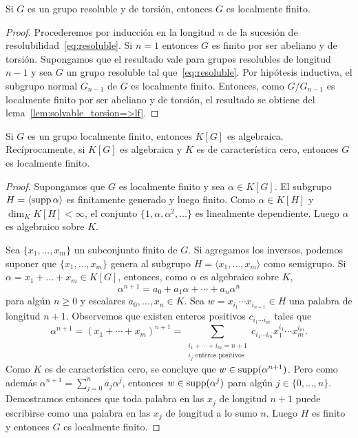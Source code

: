 \begin{exercise}
\begin{proposition}
	Si $G$ es un grupo resoluble y de torsión, entonces $G$ es localmente
	finito.
\end{proposition}

\begin{proof}
	Procederemos por inducción en la longitud $n$ de la sucesión de
	resolubilidad~\eqref{eq:resoluble}. Si $n=1$ entonces $G$ es finito por ser
	abeliano y de torsión. Supongamos que el resultado vale para grupos
	resolubles de longitud $n-1$ y sea $G$ un grupo resoluble tal
	que~\eqref{eq:resoluble}. Por hipótesis inductiva, el subgrupo normal
	$G_{n-1}$ de $G$ es localmente finito. Entonces, como $G/G_{n-1}$ es
	localmente finito por ser abeliano y de torsión, el resultado se obtiene
	del lema~\ref{lem:solvable_torsion=>lf}.
\end{proof}

\begin{theorem}[Herstein]
	Si $G$ es un grupo localmente finito, entonces $K[G]$ es algebraica.
	Recíprocamente, si $K[G]$ es algebraica y $K$ es de característica cero,
	entonces $G$ es localmente finito.
\end{theorem}

\begin{proof}
	Supongamos que $G$ es localmente finito y sea $\alpha\in K[G]$. El subgrupo
	$H=\langle\operatorname{supp}\alpha\rangle$ es finitamente generado y luego finito. Como
	$\alpha\in K[H]$ y $\dim_KK[H]<\infty$, el conjunto
	$\{1,\alpha,\alpha^2,\dots\}$ es linealmente dependiente. Luego $\alpha$ es
	algebraico sobre $K$.

	Sea $\{x_1,\dots,x_m\}$ un subconjunto finito de $G$. Si agregamos los
	inversos, podemos suponer que $\{x_1,\dots,x_m\}$ genera al subgrupo
	$H=\langle x_1,\dots,x_m\rangle$ como semigrupo. Si
	$\alpha=x_1+\dots+x_m\in K[G]$, entonces, como $\alpha$ es algebraico sobre
	$K$, 
	\[
		\alpha^{n+1}=a_0+a_1\alpha+\cdots+a_n\alpha^n
	\]
	para algún $n\geq0$ y escalares $a_0,\dots,x_n\in K$. Sea $w=x_{i_1}\cdots
	x_{i_{n+1}}\in H$ una palabra de longitud $n+1$. Observemos que existen enteros
	positivos $c_{i_1\cdots i_m}$ tales que 
	\[
		\alpha^{n+1}=(x_1+\cdots+x_m)^{n+1}
		=\sum_{\substack{{i_1+\cdots+i_m=n+1}\\{\text{$i_j$ enteros positivos}}}} c_{i_1\cdots i_m}x_1^{i_1}\cdots x_{m}^{i_m}.
	\]
	Como $K$
	es de característica cero, se concluye que $w\in\operatorname{supp}(\alpha^{n+1})$.  Pero
	como además $\alpha^{n+1}=\sum_{j=0}^na_j\alpha^j$, entonces
	$w\in\operatorname{supp}(\alpha^j)$ para algún $j\in\{0,\dots,n\}$. Demostramos entonces
	que toda palabra en las $x_j$ de longitud $n+1$ puede escribirse como una
	palabra en las $x_j$ de longitud a lo sumo $n$.  Luego $H$ es finito y
	entonces $G$ es localmente finito.
\end{proof}


\end{exercise}
